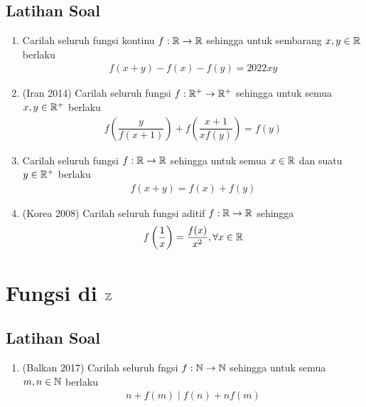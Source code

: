 \documentclass[12pt]{scrartcl}
\begin{document}
\subsection{Latihan Soal}
\begin{enumerate}
    \item Carilah seluruh fungsi kontinu $f:\mathbb R \to \mathbb R$ sehingga untuk sembarang $x,y \in \mathbb R$ berlaku
    \begin{align*}
        f(x+y)-f(x)-f(y)=2022xy
    \end{align*}
    \item (Iran 2014) Carilah seluruh fungsi $f:\mathbb R^+ \to \mathbb R^+$ sehingga untuk semua $x,y \in \mathbb R^+$ berlaku
    \begin{align*}
        f\left(\dfrac{y}{f(x+1)}\right)+f\left(\dfrac{x+1}{xf(y)}\right)=f(y)
    \end{align*}
    \item Carilah seluruh fungsi $f:\mathbb R \to \mathbb R$ sehingga untuk semua $x \in \mathbb R$ dan suatu $y \in \mathbb R^+$ berlaku
    \begin{align*}
        f(x+y)=f(x)+f(y)
    \end{align*}
    \item (Korea 2008) Carilah seluruh fungsi aditif $f:\mathbb R \to \mathbb R$ sehingga
    \begin{align*}
        f\left(\dfrac{1}{x}\right)=\dfrac{f(x)}{x^2}, \forall x \in \mathbb R
    \end{align*}
\end{enumerate}

\section{Fungsi di $\mathbb Z$}
\subsection{Latihan Soal}
\begin{enumerate}
    \item (Balkan 2017) Carilah seluruh fngsi $f:\mathbb N \to \mathbb N$ sehingga untuk semua $m,n \in \mathbb N$ berlaku
    \begin{align*}
        n+f(m) \mid f(n)+nf(m)
    \end{align*}
\end{enumerate}
\end{document}
